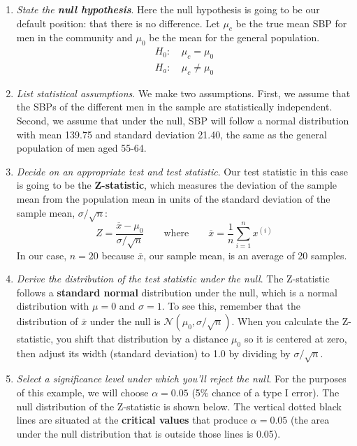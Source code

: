 \begin{enumerate}
\item \textit{State the \textbf{null hypothesis}}. Here the null hypothesis is going to be our default position: that there is no difference. Let $\mu_c$ be the true mean SBP for men in the community and $\mu_0$ be the mean for the general population. 
\begin{align*}
H_0: &~\mu_c = \mu_0 \\
H_a: &~\mu_c \neq \mu_0
\end{align*}
\item \textit{List statistical {assumptions}}. We make two assumptions. First, we assume that the SBPs of the different men in the sample are statistically independent. Second, we assume that under the null, SBP will follow a normal distribution with mean 139.75 and standard deviation 21.40, the same as the general population of men aged 55-64.
\item \textit{Decide on an appropriate test and test statistic}. Our test statistic in this case is going to be the \textbf{Z-statistic}, which measures the deviation of the sample mean from the population mean in units of the standard deviation of the sample mean, $\sigma/\sqrt{n}$:
$$ Z = \frac{\overline{x} - \mu_0}{\sigma / \sqrt{n}} \qquad \text{where} \qquad \overline{x} = \frac{1}{n} \sum_{i=1}^n x^{(i)}$$
In our case, $n = 20$ because $\overline{x}$, our sample mean, is an average of 20 samples.  
\item \textit{Derive the distribution of the test statistic under the null}. The Z-statistic follows a \textbf{standard normal} distribution under the null, which is a normal distribution with $\mu=0$ and $\sigma=1$. To see this, remember that the distribution of $\overline{x}$ under the null is $\mathcal{N}(\mu_0, \sigma/\sqrt{n})$. When you calculate the Z-statistic, you shift that distribution by a distance $\mu_0$ so it is centered at zero, then adjust its width (standard deviation) to 1.0 by dividing by $\sigma/\sqrt{n}$.
\item \textit{Select a {significance level} under which you'll reject the null}. For the purposes of this example, we will choose $\alpha = 0.05$ (5\% chance of a type I error). The null distribution of the Z-statistic is shown below. The vertical dotted black lines are situated at the \textbf{critical values} that produce $\alpha = 0.05$ (the area under the null distribution that is outside those lines is 0.05). 


\end{enumerate}
